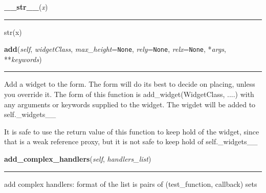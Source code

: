     \vspace{0.5ex}

    \begin{boxedminipage}{\textwidth}

    \raggedright \textbf{\_\_str\_\_}(\textit{x})

    \vspace{-1.5ex}

    \rule{\textwidth}{0.5\fboxrule}
    str(x)

    \vspace{1ex}

    \end{boxedminipage}

    \label{npyscreen:Form:Form:add}
    
    \vspace{0.5ex}

    \begin{boxedminipage}{\textwidth}

    \raggedright \textbf{add}(\textit{self}, \textit{widgetClass}, \textit{max\_height}=\texttt{None}, \textit{rely}=\texttt{None}, \textit{relx}=\texttt{None}, *\textit{args}, **\textit{keywords})

    \vspace{-1.5ex}

    \rule{\textwidth}{0.5\fboxrule}
    Add a widget to the form.  The form will do its best to decide on 
    placing, unless you override it. The form of this function is 
    add\_widget(WidgetClass, ....) with any arguments or keywords supplied 
    to the widget. The wigdet will be added to self.\_widgets\_\_

    It is safe to use the return value of this function to keep hold of the
    widget, since that is a weak reference proxy, but it is not safe to 
    keep hold of self.\_widgets\_\_

    \vspace{1ex}

    \end{boxedminipage}

    \label{npyscreen:widget:InputHandler:add_complex_handlers}

    \vspace{0.5ex}

    \begin{boxedminipage}{\textwidth}

    \raggedright \textbf{add\_complex\_handlers}(\textit{self}, \textit{handlers\_list})

    \vspace{-1.5ex}

    \rule{\textwidth}{0.5\fboxrule}
    add complex handlers: format of the list is pairs of (test\_function, 
    callback) sets

    \vspace{1ex}

    \end{boxedminipage}

